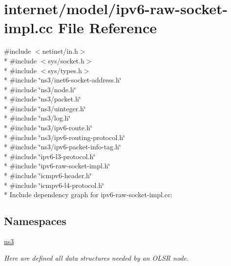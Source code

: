 \hypertarget{ipv6-raw-socket-impl_8cc}{}\section{internet/model/ipv6-\/raw-\/socket-\/impl.cc File Reference}
\label{ipv6-raw-socket-impl_8cc}
{\ttfamily \#include $<$netinet/in.\+h$>$}\\*
{\ttfamily \#include $<$sys/socket.\+h$>$}\\*
{\ttfamily \#include $<$sys/types.\+h$>$}\\*
{\ttfamily \#include \char`\"{}ns3/inet6-\/socket-\/address.\+h\char`\"{}}\\*
{\ttfamily \#include \char`\"{}ns3/node.\+h\char`\"{}}\\*
{\ttfamily \#include \char`\"{}ns3/packet.\+h\char`\"{}}\\*
{\ttfamily \#include \char`\"{}ns3/uinteger.\+h\char`\"{}}\\*
{\ttfamily \#include \char`\"{}ns3/log.\+h\char`\"{}}\\*
{\ttfamily \#include \char`\"{}ns3/ipv6-\/route.\+h\char`\"{}}\\*
{\ttfamily \#include \char`\"{}ns3/ipv6-\/routing-\/protocol.\+h\char`\"{}}\\*
{\ttfamily \#include \char`\"{}ns3/ipv6-\/packet-\/info-\/tag.\+h\char`\"{}}\\*
{\ttfamily \#include \char`\"{}ipv6-\/l3-\/protocol.\+h\char`\"{}}\\*
{\ttfamily \#include \char`\"{}ipv6-\/raw-\/socket-\/impl.\+h\char`\"{}}\\*
{\ttfamily \#include \char`\"{}icmpv6-\/header.\+h\char`\"{}}\\*
{\ttfamily \#include \char`\"{}icmpv6-\/l4-\/protocol.\+h\char`\"{}}\\*
Include dependency graph for ipv6-\/raw-\/socket-\/impl.cc\+:
\subsection*{Namespaces}
\begin{DoxyCompactItemize}
\item 
 \hyperlink{namespacens3}{ns3}
\begin{DoxyCompactList}\small\item\em Here are defined all data structures needed by an O\+L\+SR node. \end{DoxyCompactList}\end{DoxyCompactItemize}
